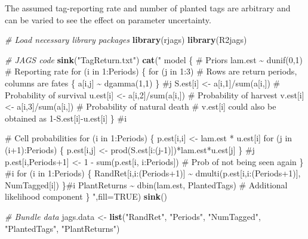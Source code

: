 \documentclass[
]{krantz}
\makeatletter
\newenvironment{Shaded}{\begin{snugshade}}{\end{snugshade}}
\newcommand{\AttributeTok}[1]{\textcolor[rgb]{0.27,0.27,0.27}{#1}}
\newcommand{\CommentTok}[1]{\textcolor[rgb]{0.37,0.37,0.37}{\textit{#1}}}
\newcommand{\ConstantTok}[1]{\textcolor[rgb]{0.37,0.37,0.37}{#1}}
\newcommand{\FunctionTok}[1]{\textcolor[rgb]{0.27,0.27,0.27}{\textbf{#1}}}
\newcommand{\NormalTok}[1]{#1}
\newcommand{\OtherTok}[1]{\textcolor[rgb]{0.37,0.37,0.37}{#1}}
\newcommand{\StringTok}[1]{\textcolor[rgb]{0.5,0.5,0.5}{#1}}
\newenvironment{kframe}{%
\medskip{}
\setlength{\fboxsep}{.8em}
 \def\at@end@of@kframe{}%
 \ifinner\ifhmode%
  \def\at@end@of@kframe{\end{minipage}}%
  \begin{minipage}{\columnwidth}%
 \fi\fi%
 \def\FrameCommand##1{\hskip\@totalleftmargin \hskip-\fboxsep
 \colorbox{shadecolor}{##1}\hskip-\fboxsep
     \hskip-\linewidth \hskip-\@totalleftmargin \hskip\columnwidth}%
 \MakeFramed {\advance\hsize-\width
   \@totalleftmargin\z@ \linewidth\hsize
   \@setminipage}}%
 {\par\unskip\endMakeFramed%
 \at@end@of@kframe}
\renewenvironment{Shaded}{\begin{kframe}}{\end{kframe}}
\makeatother
\begin{document}
The assumed tag-reporting rate and number of planted tags are arbitrary and can be varied to see the effect on parameter uncertainty.

\begin{Shaded}
\begin{Highlighting}[]
\CommentTok{\# Load necessary library packages}
\FunctionTok{library}\NormalTok{(rjags)}
\FunctionTok{library}\NormalTok{(R2jags)}

\CommentTok{\# JAGS code}
  \FunctionTok{sink}\NormalTok{(}\StringTok{"TagReturn.txt"}\NormalTok{)}
  \FunctionTok{cat}\NormalTok{(}\StringTok{"}
\StringTok{  model \{}
\StringTok{  \# Priors}
\StringTok{  lam.est \textasciitilde{} dunif(0,1) \# Reporting rate}
\StringTok{  for (i in 1:Periods) \{}
\StringTok{     for (j in 1:3) \# Rows are return periods, columns are fates}
\StringTok{       \{}
\StringTok{         a[i,j] \textasciitilde{} dgamma(1,1)}
\StringTok{       \} \#j}
\StringTok{     S.est[i] \textless{}{-} a[i,1]/sum(a[i,]) \# Probability of survival}
\StringTok{     u.est[i] \textless{}{-} a[i,2]/sum(a[i,]) \# Probability of harvest}
\StringTok{     v.est[i] \textless{}{-} a[i,3]/sum(a[i,]) \# Probability of natural death}
\StringTok{     \# v.est[i] could also be obtained as 1{-}S.est[i]{-}u.est[i]}
\StringTok{  \} \#i}

\StringTok{\# Cell probabilities}
\StringTok{  for (i in 1:Periods) \{}
\StringTok{    p.est[i,i] \textless{}{-} lam.est * u.est[i]}
\StringTok{    for (j in (i+1):Periods) \{}
\StringTok{      p.est[i,j] \textless{}{-} prod(S.est[i:(j{-}1)])*lam.est*u.est[j]}
\StringTok{      \} \#j}
\StringTok{    p.est[i,Periods+1] \textless{}{-} 1 {-} sum(p.est[i, i:Periods])   }
\StringTok{      \# Prob of not being seen again}
\StringTok{    \} \#i}
\StringTok{  for (i in 1:Periods) \{}
\StringTok{  RandRet[i,i:(Periods+1)] \textasciitilde{} dmulti(p.est[i,i:(Periods+1)], }
\StringTok{                                    NumTagged[i])}
\StringTok{  \}\#i}
\StringTok{  PlantReturns \textasciitilde{} dbin(lam.est, PlantedTags) }
\StringTok{    \# Additional likelihood component}
\StringTok{ \}}
\StringTok{  "}\NormalTok{,}\AttributeTok{fill=}\ConstantTok{TRUE}\NormalTok{)}
  \FunctionTok{sink}\NormalTok{()}

\CommentTok{\# Bundle data}
\NormalTok{  jags.data }\OtherTok{\textless{}{-}} \FunctionTok{list}\NormalTok{(}\StringTok{"RandRet"}\NormalTok{, }\StringTok{"Periods"}\NormalTok{, }\StringTok{"NumTagged"}\NormalTok{, }\StringTok{"PlantedTags"}\NormalTok{,}
                    \StringTok{"PlantReturns"}\NormalTok{)}


\end{Highlighting}
\end{Shaded}
\end{document}
